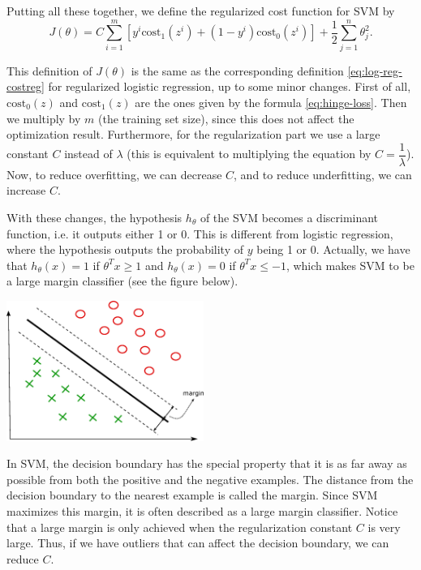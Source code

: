 \documentclass[a4paper,11pt]{report}
\begin{document}
Putting all these together, we define the regularized cost function for SVM by
\begin{equation}\label{eq:svm-cost}
J(\theta) = C\displaystyle\sum_{i=1}^m \left[y^{i}\text{cost}_1(z^{i}) + (1 - y^{i})\text{cost}_0(z^{i})\right] + \dfrac{1}{2}\sum_{j=1}^n \theta^2_j.
\end{equation}

This definition of $J(\theta)$ is the same as the corresponding definition \ref{eq:log-reg-costreg} for regularized logistic regression, up to some minor changes. First of all, $\text{cost}_0(z)$ and $\text{cost}_1(z)$ are the ones given by the formula \ref{eq:hinge-loss}. Then we multiply by $m$ (the training set size), since this does not affect the optimization result. Furthermore, for the regularization part we use a large constant $C$ instead of $\lambda$ (this is equivalent to multiplying the equation by $C = \dfrac{1}{\lambda}$). Now, to reduce overfitting, we can decrease $C$, and to reduce underfitting, we can increase $C$.

With these changes, the hypothesis $h_\theta$ of the SVM becomes a discriminant function, i.e. it outputs either 1 or 0. This is different from logistic regression, where the hypothesis outputs the probability of $y$ being 1 or 0. Actually, we have that $h_\theta(x) = 1$ if $\theta^Tx \ge 1$ and $h_\theta(x) = 0$ if $\theta^Tx \le -1$, which makes SVM to be a large margin classifier (see the figure below).

\hspace{1.0in}
\begin{center}
\includegraphics[height = 1.8in]{Images/svm}
\end{center}

In SVM, the decision boundary has the special property that it is as far away as possible from both the positive and the negative examples. The distance from the decision boundary to the nearest example is called the margin. Since SVM maximizes this margin, it is often described as a large margin classifier. Notice that a large margin is only achieved when the regularization constant $C$ is very large. Thus, if we have outliers that can affect the decision boundary, we can reduce $C$.
\end{document}
